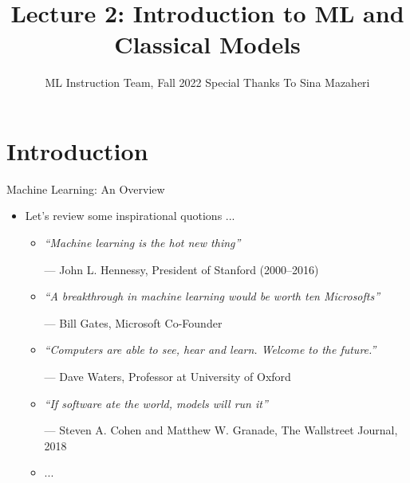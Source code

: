 \documentclass[compress,oilve]{beamer}
\title{Lecture 2: Introduction to ML and Classical Models}
\author{ML Instruction Team, Fall 2022 \newline Special Thanks To Sina Mazaheri}
\institute[]{CE Department \newline  Sharif University of Technology \newline \newline}
\date[\today]{}
\begin{document}
	
	\fontsize{9}{9}
\begin{frame}
	\titlepage
\end{frame}

\section{Introduction}

\begin{frame}{Machine Learning: An Overview}
\begin{itemize}
\item Let's review some inspirational quotions ... \\
\begin{itemize}
	\item \textit{“Machine learning is the hot new thing”} \\ \begin{center}
— John L. Hennessy, President of Stanford (2000–2016) \end{center}
	\item\textit{ “A breakthrough in machine learning would be worth ten Microsofts” }\\ \begin{center}
— Bill Gates, Microsoft Co-Founder  \end{center}
	\item \textit{“Computers are able to see, hear and learn.  Welcome to the future.” }\\ \begin{center}
— Dave Waters, Professor at University of Oxford \end{center}
	\item \textit{“If software ate the world, models will run it”}
\\ \begin{center}
— Steven A. Cohen and Matthew W. Granade, The Wallstreet Journal, 2018\end{center}
	\item ...
\end{itemize}	
\end{itemize}
\end{frame}
\end{document}

